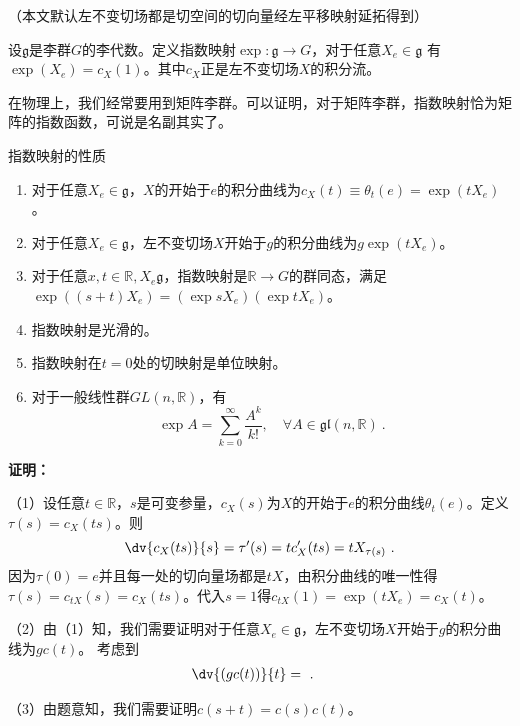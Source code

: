 
（本文默认左不变切场都是切空间的切向量经左平移映射延拓得到）
\begin{definition}{}
设$\mathfrak g$是李群$G$的李代数。定义指数映射$\exp :\mathfrak g\to G$，对于任意$X_e\in \mathfrak g$ 有$\exp (X_e)=c_X(1)$。其中$c_X$正是左不变切场$X$的积分流。
\end{definition}
在物理上，我们经常要用到矩阵李群。可以证明，对于矩阵李群，指数映射恰为矩阵的指数函数，可说是名副其实了。

\begin{theorem}{指数映射的性质}
\begin{enumerate}
\item 对于任意$X_e\in \mathfrak g$，$X$的开始于$e$的积分曲线为$c_X(t)\equiv\theta_t(e)=\exp (tX_e)$。
\item 对于任意$X_e\in \mathfrak g$，左不变切场$X$开始于$g$的积分曲线为$g\exp (tX_e)$。
\item 对于任意$x,t\in\mathbb R,X_e\mathfrak g$，指数映射是$\mathbb R\to G$的群同态，满足$\exp ((s+t)X_e)=(\exp sX_e)(\exp tX_e)$。

\item 指数映射是光滑的。
\item 指数映射在$t=0$处的切映射是单位映射。
\item 对于一般线性群$GL(n,\mathbb R)$，有
\begin{equation}
\exp  A=\sum_{k=0}^\infty\frac{A^k}{k!},\quad \forall A\in\mathfrak{gl}(n,\mathbb{R})~.
\end{equation}
\end{enumerate}
\end{theorem}

\textbf{证明：}

（1）设任意$t\in \mathbb R$，$s$是可变参量，$c_X(s)$为$X$的开始于$e$的积分曲线$\theta_t(e)$。定义$\tau(s)=c_X(ts)$。则
\begin{equation}
\dv{c_X(ts)}{s}=\tau'(s)=tc'_X(ts)=tX_{\tau (s)}~.
\end{equation}
因为$\tau(0)=e$并且每一处的切向量场都是$tX$，由积分曲线的唯一性得$\tau(s)=c_{tX}(s)=c_X(ts)$。代入$s=1$得$c_{tX}(1)=\exp(tX_e)=c_X(t)$。

（2）由（1）知，我们需要证明对于任意$X_e\in \mathfrak g$，左不变切场$X$开始于$g$的积分曲线为$gc(t)$。
考虑到
\begin{equation}
\begin{aligned}
\dv{(gc(t))}{t}&=~.
\end{aligned}
\end{equation}


（3）由题意知，我们需要证明$c(s+t)=c(s)c(t)$。